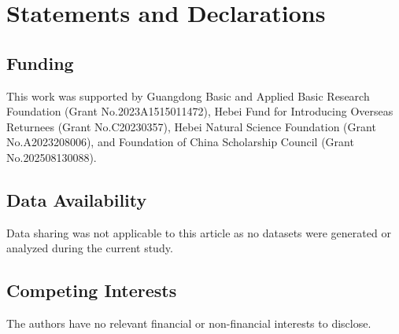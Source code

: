 \documentclass[12pt]{article}
\begin{document}
\section*{Statements and Declarations}

\subsection*{Funding}

This work was supported by Guangdong Basic and Applied Basic Research Foundation (Grant No.2023A1515011472), Hebei Fund for Introducing Overseas Returnees (Grant No.C20230357), Hebei Natural Science Foundation (Grant No.A2023208006), and Foundation of China Scholarship Council (Grant No.202508130088).


\subsection*{Data Availability}

Data sharing was not applicable to this article as no datasets were generated or analyzed
during the current study.

\subsection*{Competing Interests}


The authors have no relevant financial or non-financial interests to disclose.
\end{document}
